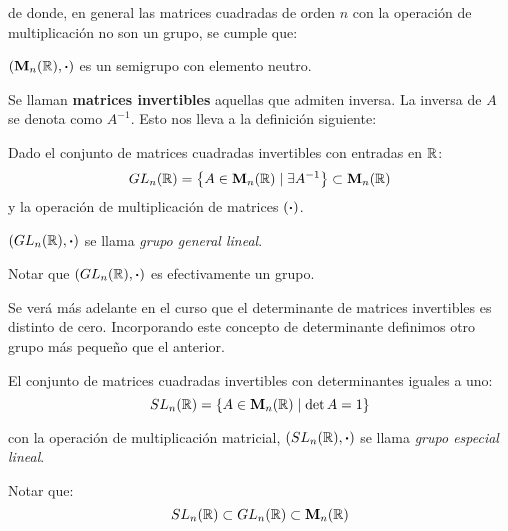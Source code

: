 de donde, en general las matrices cuadradas de orden $n$ con la operación de multiplicación no son un grupo, se cumple que:

\begin{center}
	$(\mathbf{M}_n(\mathbb{R}), \boldsymbol{\cdot})$ es un semigrupo con elemento neutro.
\end{center}

Se llaman \textbf{matrices invertibles} aquellas que admiten inversa. La inversa de $A$ se denota como $A^{-1}$. Esto nos lleva a la definición siguiente: 

\begin{fmd-definition}
	Dado el conjunto de matrices cuadradas invertibles con entradas en $\mathbb{R}$:
	\[ GL_n(\mathbb{R}) = \left\{ A \in \mathbf{M}_n(\mathbb{R}) \mid \exists A^{-1} \right\} \subset \mathbf{M}_n(\mathbb{R}) \]
	y la operación de multiplicación de matrices $(\boldsymbol{\cdot})$.
	
	$(GL_n(\mathbb{R}), \boldsymbol{\cdot})$ se llama \textit{grupo general lineal}.
\end{fmd-definition}

Notar que $(GL_n(\mathbb{R}), \boldsymbol{\cdot})$ es efectivamente un grupo.

Se verá más adelante en el curso que el determinante de matrices invertibles es distinto de cero. Incorporando este concepto de determinante definimos otro grupo más pequeño que el anterior.

\begin{fmd-definition}
	El conjunto de matrices cuadradas invertibles con determinantes iguales a uno:
	\[ SL_n(\mathbb{R}) = \left\{ A \in \mathbf{M}_n(\mathbb{R}) \mid \det A = 1 \right\} \]
	
	con la operación de multiplicación matricial, $(SL_n(\mathbb{R}), \boldsymbol{\cdot})$ se llama \textit{grupo especial lineal}.
\end{fmd-definition}
Notar que:
\[ SL_n(\mathbb{R}) \subset GL_n(\mathbb{R}) \subset \mathbf{M}_n(\mathbb{R})\]

